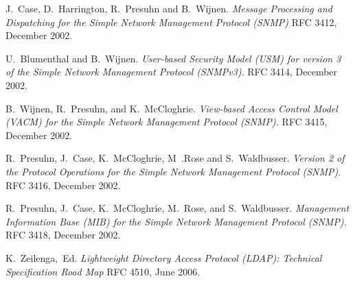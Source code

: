 \documentclass[reprint,natbib,9pt]{sigplanconf}
\begin{document}
\begin{thebibliography}{10}
J.~Case, D.~Harrington, R.~Presuhn and B.~Wijnen.
\newblock \textsl{Message Processing and Dispatching for the
               Simple Network Management Protocol (SNMP)}
\newblock RFC 3412, December 2002.

U.~Blumenthal and B.~Wijnen.
\newblock \textsl{User-based Security Model (USM) for version 3 of the
              Simple Network Management Protocol (SNMPv3)}.
\newblock RFC 3414, December 2002.

B.~Wijnen, R.~Presuhn, and K.~McCloghrie.
\newblock \textsl{View-based Access Control Model (VACM) for the
  Simple Network Management Protocol (SNMP).}
\newblock RFC 3415, December 2002.

R.~Presuhn, J.~Case, K.~McCloghrie, M~.Rose and S.~Waldbusser.
\newblock \textsl{Version 2 of the Protocol Operations for
             the Simple Network Management Protocol (SNMP)}.
\newblock RFC 3416, December 2002.

R.~Presuhn, J.~Case, K.~McCloghrie, M.~Rose, and S.~Waldbusser.
\newblock \textsl{Management Information Base (MIB) for the Simple
  Network Management Protocol (SNMP).}
\newblock RFC 3418, December 2002.

K.~Zeilenga,~Ed.
\newblock \textsl{Lightweight Directory Access Protocol (LDAP):
                    Technical Specification Road Map}
\newblock RFC 4510, June 2006.

\end{thebibliography}
\end{document}
